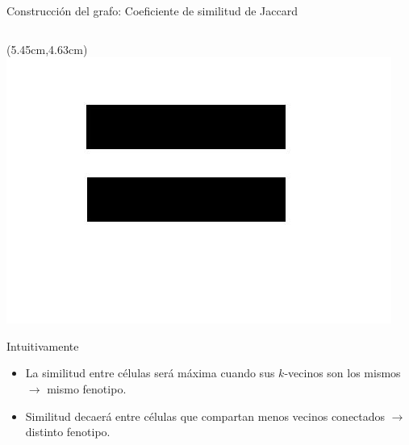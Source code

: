 \begin{frame}{Construcción del grafo: Coeficiente de similitud de Jaccard}
\begin{columns}
\begin{column}{0.5\textwidth}
      \end{column}
    \end{columns}
    \begin{textblock*}{5cm}(5.45cm,4.63cm)
      \includegraphics[scale=0.04]{images/equal.jpg}
    \end{textblock*}
    \begin{alertblock}{Intuitivamente}
      \begin{itemize}
        \item La similitud entre células será máxima cuando sus $k$-vecinos son los
              mismos $\rightarrow$ mismo fenotipo.
        \item Similitud decaerá entre células que compartan menos vecinos conectados
              $\rightarrow$ distinto fenotipo.
      \end{itemize}
    \end{alertblock}
  \end{frame}
  
  
